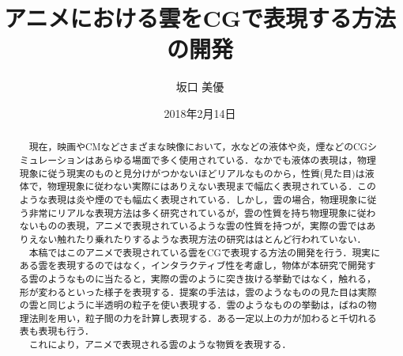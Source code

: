 \documentclass[11pt]{jreport}
\title{アニメにおける雲をCGで表現する方法の開発}
\author{坂口 美優}
\date{2018年2月14日}	%
\begin{document}
\maketitle

\begin{abstract}
　現在，映画やCMなどさまざまな映像において，水などの液体や炎，煙などのCGシミュレーションはあらゆる場面で多く使用されている．なかでも液体の表現は，物理現象に従う現実のものと見分けがつかないほどリアルなものから，性質(見た目)は液体で，物理現象に従わない実際にはありえない表現まで幅広く表現されている．このような表現は炎や煙のでも幅広く表現されている．しかし，雲の場合，物理現象に従う非常にリアルな表現方法は多く研究されているが，雲の性質を持ち物理現象に従わないものの表現，アニメで表現されているような雲の性質を持つが，実際の雲ではありえない触れたり乗れたりするような表現方法の研究ははとんど行われていない．\\
　本稿ではこのアニメで表現されている雲をCGで表現する方法の開発を行う．現実にある雲を表現するのではなく，インタラクティブ性を考慮し，物体が本研究で開発する雲のようなものに当たると，実際の雲のように突き抜ける挙動ではなく，触れる，形が変わるといった様子を表現する．提案の手法は，雲のようなものの見た目は実際の雲と同じように半透明の粒子を使い表現する．雲のようなものの挙動は，ばねの物理法則を用い，粒子間の力を計算し表現する．ある一定以上の力が加わると千切れる表も表現も行う．\\
　これにより，アニメで表現される雲のような物質を表現する．


\end{abstract}

\tableofcontents



\newpage
{}	%


\end{document}
